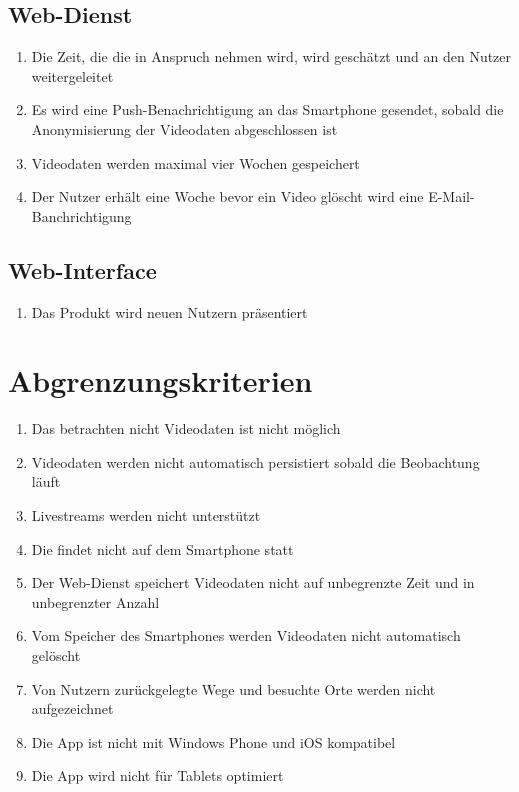 \subsection{Web-Dienst}
	\begin{enumerate}
	\renewcommand{\labelenumi}{\textbf{\theenumi}}
	\renewcommand{\theenumi}{WK\arabic{enumi}0}
	\setcounter{enumi}{199}
	\item Die Zeit, die die  in Anspruch nehmen wird, wird geschätzt und an den Nutzer weitergeleitet
	\item Es wird eine Push-Benachrichtigung an das \gls{Smartphone} gesendet, sobald die Anonymisierung der Videodaten abgeschlossen ist
	\item Videodaten werden maximal vier Wochen gespeichert
	\item Der Nutzer erhält eine Woche bevor ein Video glöscht wird eine \gls{E-Mail}-Banchrichtigung
	\end{enumerate}
\subsection{Web-Interface}
	\begin{enumerate}
	\renewcommand{\labelenumi}{\textbf{\theenumi}}
	\renewcommand{\theenumi}{WK\arabic{enumi}0}
	\setcounter{enumi}{299}
	\item Das Produkt wird neuen Nutzern präsentiert
	\end{enumerate}

\section{Abgrenzungskriterien}
	\begin{enumerate}
	\renewcommand{\labelenumi}{\textbf{\theenumi}}
	\renewcommand{\theenumi}{AK\arabic{enumi}0}
	\item Das betrachten nicht  Videodaten ist nicht möglich
	\item Videodaten werden nicht automatisch persistiert sobald die Beobachtung läuft
	\item \glspl{Livestream} werden nicht unterstützt
	\item Die  findet nicht auf dem \gls{Smartphone} statt
	\item Der \gls{Web-Dienst} speichert Videodaten nicht auf unbegrenzte Zeit und in unbegrenzter Anzahl
	\item Vom Speicher des Smartphones werden Videodaten nicht automatisch gelöscht
	\item Von Nutzern zurückgelegte Wege und besuchte Orte werden nicht aufgezeichnet
	\item Die \gls{App} ist nicht mit Windows Phone und iOS kompatibel
	\item Die \gls{App} wird nicht für Tablets optimiert
	\end{enumerate}